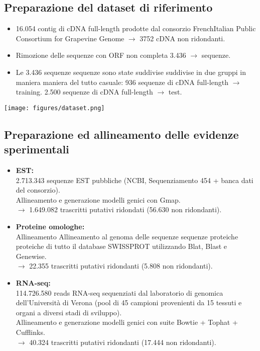 \documentclass{article}
\begin{document}
\subsection{Preparazione del dataset di riferimento}
\begin{itemize}
    \item 16.054 contig di cDNA full-length prodotte dal consorzio FrenchItalian Public Consortium for Grapevine Genome $\rightarrow$ 3752 cDNA non ridondanti.
    \item Rimozione delle sequenze con ORF non completa  3.436 $\rightarrow$ sequenze.
    \item Le 3.436 sequenze sequenze sono state suddivise suddivise in due gruppi in maniera maniera
    del tutto casuale:
        \subitem{-} 936 sequenze di cDNA full-length $\rightarrow$ training.
        \subitem{-} 2.500 sequenze di cDNA full-length $\rightarrow$ test.
\end{itemize}
\begin{center}
    \texttt{[image: figures/dataset.png]}
\end{center}

\subsection{Preparazione ed allineamento delle evidenze sperimentali}
\begin{itemize}
    \item \textbf{EST:}\\ 2.713.343 sequenze EST pubbliche (NCBI,
    Sequenziamento 454 + banca dati del consorzio). \\Allineamento e generazione modelli genici con Gmap.\\$\rightarrow$ 1.649.082 trascritti putativi ridondati (56.630 non
    ridondanti).
    \item \textbf{Proteine omologhe:}\\Allineamento Allineamento al genoma delle sequenze sequenze proteiche proteiche di
    tutto il database SWISSPROT utilizzando Blat, Blast e Genewise.\\
    $\rightarrow$ 22.355 trascritti putativi ridondanti (5.808 non
    ridondanti).
    \item \textbf{RNA-seq:}\\114.726.580 reads RNA-seq sequenziati dal laboratorio
    di genomica dell'Università di Verona (pool di 45
    campioni provenienti da 15 tessuti e organi a diversi
    stadi di sviluppo).\\Allineamento e generazione modelli genici con suite
    Bowtie + Tophat + Cufflinks.\\
    $\rightarrow$ 40.324 trascritti putativi ridondanti (17.444 non
    ridondanti).
\end{itemize}
\end{document}
